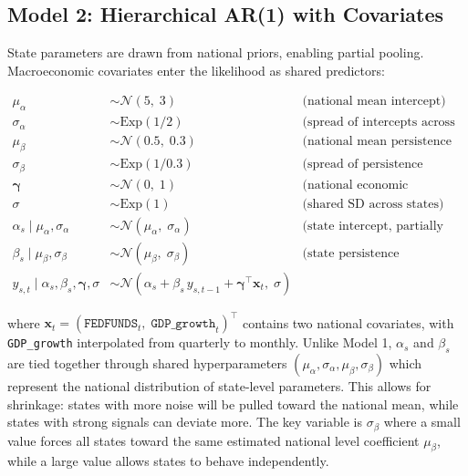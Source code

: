 \documentclass[11pt]{article}
\begin{document}
\subsection{Model 2: Hierarchical AR(1) with Covariates}

State parameters are drawn from national priors, enabling
partial pooling. Macroeconomic covariates enter the likelihood as shared
predictors:

\begin{align*}
  \mu_\alpha &\sim \mathcal{N}(5,\; 3) 
    & \text{(national mean intercept)} \\
  \sigma_\alpha &\sim \mathrm{Exp}(1/2) 
    & \text{(spread of intercepts across states)} \\
  \mu_\beta &\sim \mathcal{N}(0.5,\; 0.3) 
    & \text{(national mean persistence coefficient)} \\
  \sigma_\beta &\sim \mathrm{Exp}(1/0.3) 
    & \text{(spread of persistence coefficients across states)} \\
  \boldsymbol{\gamma} &\sim \mathcal{N}(0,\; 1) 
    & \text{(national economic covariate coefficients)} \\
  \sigma &\sim \mathrm{Exp}(1) 
    & \text{(shared SD across states)} \\[6pt]
  \alpha_s \mid \mu_\alpha, \sigma_\alpha &\sim \mathcal{N}(\mu_\alpha,\; \sigma_\alpha)
    & \text{(state intercept, partially pooled)} \\
  \beta_s \mid \mu_\beta, \sigma_\beta &\sim \mathcal{N}(\mu_\beta,\; \sigma_\beta)
    & \text{(state persistence coefficient, partially pooled)} \\[6pt]
  y_{s,t} \mid \alpha_s, \beta_s, \boldsymbol{\gamma}, \sigma
    &\sim \mathcal{N}\!\left(
        \alpha_s + \beta_s\, y_{s,t-1} + \boldsymbol{\gamma}^\top \mathbf{x}_t,\;
        \sigma
      \right) 
\end{align*}

where $\mathbf{x}_t = (\texttt{FEDFUNDS}_t,\; \texttt{GDP\_growth}_t)^\top$
contains two national covariates, with
\texttt{GDP\_growth} interpolated from quarterly to monthly.
Unlike Model 1, $\alpha_s$ and $\beta_s$ are tied together through shared
hyperparameters $(\mu_\alpha, \sigma_\alpha, \mu_\beta, \sigma_\beta)$ which represent
the national distribution of state-level parameters. This allows for
shrinkage: states with more noise will be pulled toward the national mean, while states with strong signals can deviate more.
The key variable is $\sigma_\beta$ where a small value forces all states toward the same estimated national level
coefficient $\mu_\beta$, while a large value allows states to behave
independently. 
\end{document}
